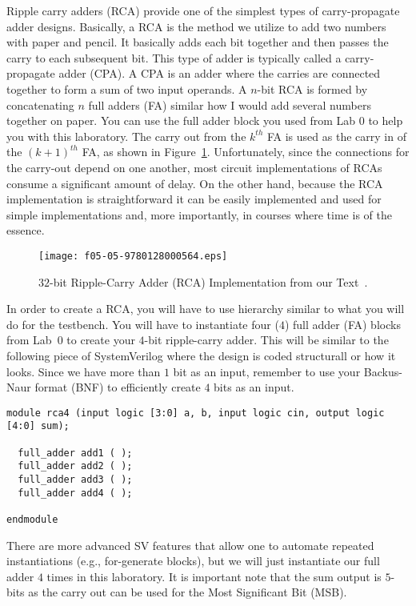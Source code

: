 \documentclass{article}
\begin{document}
Ripple carry adders (RCA) provide one of the simplest types of
carry-propagate adder designs.  Basically, a RCA is the method we
utilize to add two numbers
with paper and pencil.  It basically adds each bit together and then
passes the carry to each subsequent bit.  This type  of adder
is typically called a carry-propagate adder (CPA).
A CPA is an adder
where the carries are connected together to form a sum of two input
operands.
A $n$-bit RCA is formed by concatenating $n$ full adders (FA) similar
how I would add several numbers together on paper.  You
can use the full adder block you used from Lab 0 to help you with this
laboratory.  
The carry out from the $k^{th}$ FA is used as the carry in of 
the $(k + 1)^{th}$ FA, as shown in Figure~\ref{rca.fig}.  
Unfortunately, since 
the connections for the carry-out depend on one another, 
most circuit implementations of RCAs
consume a significant amount of delay.  On the other hand, 
because the RCA implementation is straightforward
it can be easily implemented and
used for simple implementations and, more importantly, in courses
where time is of the essence.
\begin{figure} [tb]
\begin{center}
\texttt{[image: f05-05-9780128000564.eps]}
\end{center}
\caption{$32$-bit Ripple-Carry Adder (RCA) Implementation from our Text~\cite{ddca-riscv}.}
\label{rca.fig}
\end{figure}

In order to create a RCA, you will have to use hierarchy similar to
what you will do for the testbench.  You will have to instantiate four
($4$) full adder (FA) blocks from Lab~$0$ to create your $4$-bit
ripple-carry adder.  This will be similar to the following piece of
SystemVerilog where the design is coded structurall or how it looks.
Since we have more than $1$ bit as an input, remember to use your
Backus-Naur format (BNF) to efficiently create $4$ bits as an input.
\clearpage
\begin{verbatim}
module rca4 (input logic [3:0] a, b, input logic cin, output logic [4:0] sum);

  full_adder add1 ( );
  full_adder add2 ( );
  full_adder add3 ( );
  full_adder add4 ( );

endmodule
\end{verbatim}
There are more advanced SV features that
allow one to automate repeated instantiations (e.g., for-generate
blocks), but we will just instantiate our full adder $4$ times in this
laboratory.  It is important note that the sum output is $5$-bits as
the carry out can be used for the Most Significant Bit (MSB).
\end{document}
